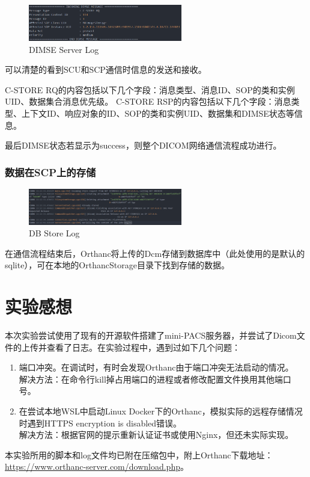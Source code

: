 \documentclass[UTF8]{ctexart}
\begin{document}
\begin{figure}[H]
    \centering
    \includegraphics[width=0.6\textwidth]{DIMSE server.png}
    \caption{DIMSE Server Log}
    \label{fig: log server}
\end{figure}
可以清楚的看到SCU和SCP通信时信息的发送和接收。

C-STORE RQ的内容包括以下几个字段：消息类型、消息ID、SOP的类和实例UID、数据集合消息优先级。
C-STORE RSP的内容包括以下几个字段：消息类型、上下文ID、响应对象的ID、SOP的类和实例UID、数据集和DIMSE状态等信息。

最后DIMSE状态若显示为success，则整个DICOM网络通信流程成功进行。

\subsubsection{数据在SCP上的存储}
\begin{figure}[H]
    \centering
    \includegraphics[width=0.6\textwidth]{log store.png}
    \caption{DB Store Log}
    \label{fig: log db}
\end{figure}
在通信流程结束后，Orthanc将上传的Dcm存储到数据库中（此处使用的是默认的sqlite），可在本地的OrthancStorage目录下找到存储的数据。

\section{实验感想}

本次实验尝试使用了现有的开源软件搭建了mini-PACS服务器，并尝试了Dicom文件的上传并查看了日志。在实验过程中，遇到过如下几个问题：
\begin{enumerate}
    \item 端口冲突。在调试时，有时会发现Orthanc由于端口冲突无法启动的情况。\\解决方法：在命令行kill掉占用端口的进程或者修改配置文件换用其他端口号。
    \item 在尝试本地WSL中启动Linux Docker下的Orthanc，模拟实际的远程存储情况时遇到HTTPS encryption is disabled错误。\\ 解决方法：根据官网的提示重新认证证书或使用Nginx，但还未实际实现。
\end{enumerate}

本实验所用的脚本和log文件均已附在压缩包中，附上Orthanc下载地址：\url{https://www.orthanc-server.com/download.php}。


\end{document}
